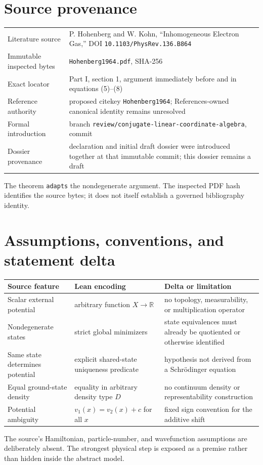 \section{Source provenance}
\begin{tabularx}{\textwidth}{@{}lY@{}}
\toprule
Literature source & P. Hohenberg and W. Kohn, ``Inhomogeneous Electron Gas,'' DOI \texttt{10.1103/PhysRev.136.B864} \\
Immutable inspected bytes & \texttt{Hohenberg1964.pdf}, SHA-256  \\
Exact locator & Part I, section 1, argument immediately before and in equations (5)--(8) \\
Reference authority & proposed citekey \texttt{Hohenberg1964}; References-owned canonical identity remains unresolved \\
Formal introduction & branch \texttt{review/conjugate-linear-coordinate-algebra}, commit  \\
Dossier provenance & declaration and initial draft dossier were introduced together at that immutable commit; this dossier remains a draft \\
\bottomrule
\end{tabularx}
The theorem \texttt{adapts} the nondegenerate argument.  The inspected PDF hash identifies the
source bytes; it does not itself establish a governed bibliography identity.

\section{Assumptions, conventions, and statement delta}
\begin{tabularx}{\textwidth}{@{}YYY@{}}
\toprule
Source feature & Lean encoding & Delta or limitation \\
\midrule
Scalar external potential & arbitrary function \(X\to\mathbb R\) & no topology, measurability, or multiplication operator \\
Nondegenerate states & strict global minimizers & state equivalences must already be quotiented or otherwise identified \\
Same state determines potential & explicit shared-state uniqueness predicate & hypothesis not derived from a Schrödinger equation \\
Equal ground-state density & equality in arbitrary density type \(D\) & no continuum density or representability construction \\
Potential ambiguity & \(v_1(x)=v_2(x)+c\) for all \(x\) & fixed sign convention for the additive shift \\
\bottomrule
\end{tabularx}
The source's Hamiltonian, particle-number, and wavefunction assumptions are deliberately absent.
The strongest physical step is exposed as a premise rather than hidden inside the abstract model.

